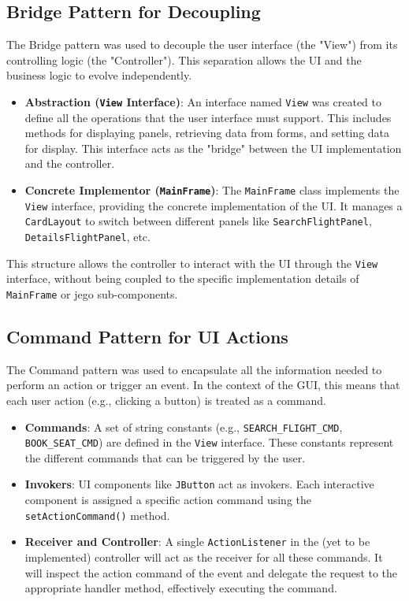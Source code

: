 \documentclass[conference]{IEEEtran}
\begin{document}
    \subsection{Bridge Pattern for Decoupling}
    The Bridge pattern was used to decouple the user interface (the "View") from its controlling logic (the "Controller"). This separation allows the UI and the business logic to evolve independently.

    \begin{itemize}
        \item \textbf{Abstraction (\texttt{View} Interface)}: An interface named \texttt{View} was created to define all the operations that the user interface must support. This includes methods for displaying panels, retrieving data from forms, and setting data for display. This interface acts as the "bridge" between the UI implementation and the controller.

        \item \textbf{Concrete Implementor (\texttt{MainFrame})}: The \texttt{MainFrame} class implements the \texttt{View} interface, providing the concrete implementation of the UI. It manages a \texttt{CardLayout} to switch between different panels like \texttt{SearchFlightPanel}, \texttt{DetailsFlightPanel}, etc.
    \end{itemize}

    This structure allows the controller to interact with the UI through the \texttt{View} interface, without being coupled to the specific implementation details of \texttt{MainFrame} or jego sub-components.

    \subsection{Command Pattern for UI Actions}
    The Command pattern was used to encapsulate all the information needed to perform an action or trigger an event. In the context of the GUI, this means that each user action (e.g., clicking a button) is treated as a command.

    \begin{itemize}
        \item \textbf{Commands}: A set of string constants (e.g., \texttt{SEARCH\_FLIGHT\_CMD}, \texttt{BOOK\_SEAT\_CMD}) are defined in the \texttt{View} interface. These constants represent the different commands that can be triggered by the user.

        \item \textbf{Invokers}: UI components like \texttt{JButton} act as invokers. Each interactive component is assigned a specific action command using the \texttt{setActionCommand()} method.

        \item \textbf{Receiver and Controller}: A single \texttt{ActionListener} in the (yet to be implemented) controller will act as the receiver for all these commands. It will inspect the action command of the event and delegate the request to the appropriate handler method, effectively executing the command.
    \end{itemize}
\end{document}
